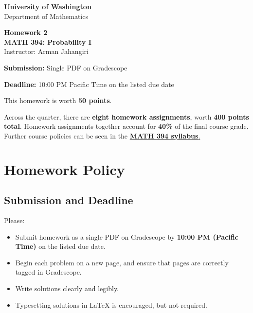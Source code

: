 \documentclass[11pt]{article}
\newcommand{\course}{MATH 394: Probability I}
\newcommand{\department}{Department of Mathematics}
\newcommand{\university}{University of Washington}
\begin{document}
\begin{titlepage}
\centering
\vspace*{1.2cm}

{\Large \textbf{\university}}\\
{\large \department}

\vspace{1.5cm}

{\Huge \color{uwpurple}\textbf{Homework 2}}\\[0.25cm]
{\Large \textbf{\course}}\\[0.25cm]
{\large Instructor: Arman Jahangiri}

\vspace{1cm}

\begin{tcolorbox}[
    width=0.78\textwidth,
    colback=softpurple,
    colframe=uwpurple,
    boxrule=0.9pt,
    arc=3mm
]
\centering
\textbf{Submission:} Single PDF on Gradescope

\textbf{Deadline:} 10:00 PM Pacific Time on the listed due date
\end{tcolorbox}

\vspace{0.8cm}

\begin{tcolorbox}[
    width=0.86\textwidth,
    colback=white,
    colframe=uwgold,
    boxrule=0.8pt,
    arc=3mm
]
This homework is worth \textbf{50 points}.

Across the quarter, there are \textbf{eight homework assignments}, worth \textbf{400 points total}. Homework assignments together account for \textbf{40\%} of the final course grade. Further course policies can be seen in the \href{https://armanjg.github.io/MATH-394-Probability-1-v2/}{\textbf{MATH 394 syllabus}.}
\end{tcolorbox}

\vfill
\end{titlepage}

\section*{Homework Policy}

\subsection*{Submission and Deadline}

Please:

\begin{itemize}[leftmargin=*]
    \item Submit homework as a single PDF on Gradescope by \textbf{10:00 PM (Pacific Time)} on the listed due date.
    \item Begin each problem on a new page, and ensure that pages are correctly tagged in Gradescope.
    \item Write solutions clearly and legibly.
    \item Typesetting solutions in LaTeX is encouraged, but not required.
\end{itemize}
\end{document}
